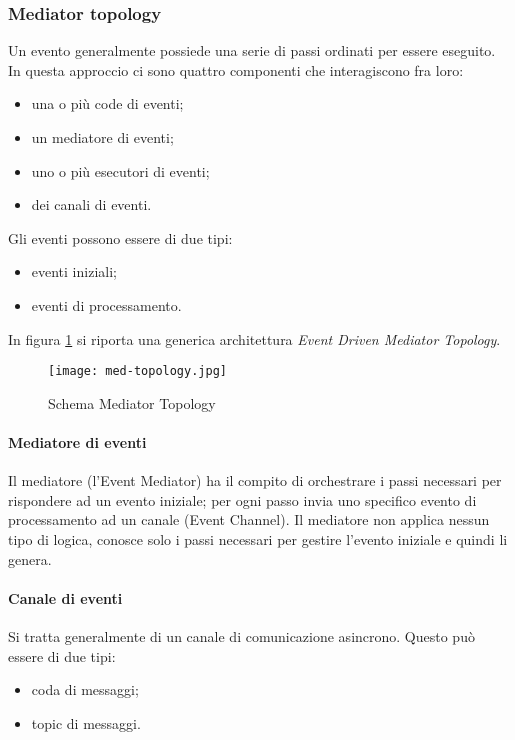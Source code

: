 \subsubsection{Mediator topology}
Un evento generalmente possiede una serie di passi ordinati per essere eseguito. In questa approccio ci sono quattro componenti che interagiscono fra loro:
\begin{itemize}
    \item una o più code di eventi;
    \item un mediatore di eventi;
    \item uno o più esecutori di eventi;
    \item dei canali di eventi.
\end{itemize}
    
Gli eventi possono essere di due tipi:
\begin{itemize}
    \item eventi iniziali;
    \item eventi di processamento.
\end{itemize}
    
In figura \ref{fig:eventdriver-med-top} si riporta una generica architettura \emph{Event Driven Mediator Topology}.   
\begin{figure}[htbp]
    \centering
    \texttt{[image: med-topology.jpg]} 
    \caption{Schema Mediator Topology}
    \label{fig:eventdriver-med-top} 
\end{figure}

\paragraph{Mediatore di eventi}
Il mediatore (l’Event Mediator) ha il compito di orchestrare i passi necessari per rispondere ad un evento iniziale; per ogni passo invia uno specifico evento di processamento ad un canale (Event Channel). Il mediatore non applica nessun tipo di logica, conosce solo i passi necessari per gestire l’evento iniziale e quindi li genera.
\paragraph{Canale di eventi}
Si tratta generalmente di un canale di comunicazione asincrono. Questo può essere di due tipi:
\begin{itemize}
    \item coda di messaggi;
    \item topic di messaggi.
\end{itemize}

